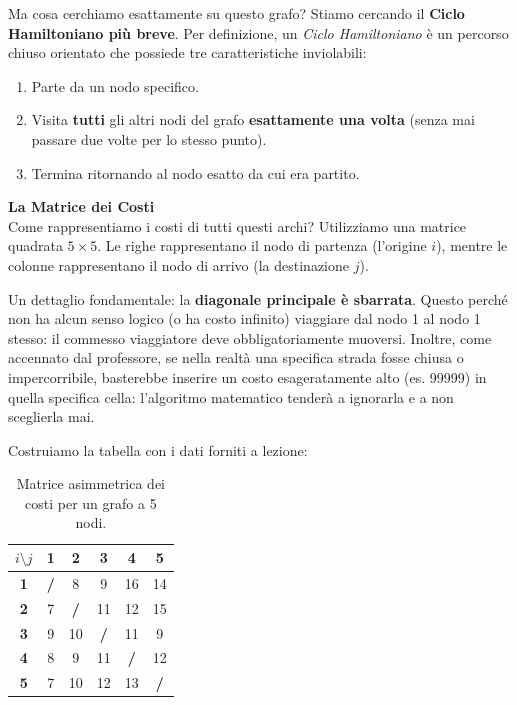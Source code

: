 \documentclass[12pt, a4paper]{article}
\renewcommand{\arraystretch}{1.25}
\begin{document}
	Ma cosa cerchiamo esattamente su questo grafo? Stiamo cercando il \textbf{Ciclo Hamiltoniano più breve}. 
	Per definizione, un \textit{Ciclo Hamiltoniano} è un percorso chiuso orientato che possiede tre caratteristiche inviolabili:
	\begin{enumerate}
		\item Parte da un nodo specifico.
		\item Visita \textbf{tutti} gli altri nodi del grafo \textbf{esattamente una volta} (senza mai passare due volte per lo stesso punto).
		\item Termina ritornando al nodo esatto da cui era partito.
	\end{enumerate}
	
	\vspace{0.4cm}
	\textbf{La Matrice dei Costi}\\
	Come rappresentiamo i costi di tutti questi archi? Utilizziamo una matrice quadrata $5 \times 5$. 
	Le righe rappresentano il nodo di partenza (l'origine $i$), mentre le colonne rappresentano il nodo di arrivo (la destinazione $j$).
	
	Un dettaglio fondamentale: la \textbf{diagonale principale è sbarrata}. Questo perché non ha alcun senso logico (o ha costo infinito) viaggiare dal nodo 1 al nodo 1 stesso: il commesso viaggiatore deve obbligatoriamente muoversi. Inoltre, come accennato dal professore, se nella realtà una specifica strada fosse chiusa o impercorribile, basterebbe inserire un costo esageratamente alto (es. 99999) in quella specifica cella: l'algoritmo matematico tenderà a ignorarla e a non sceglierla mai.
	
	Costruiamo la tabella con i dati forniti a lezione:
	
	\begin{table}[H]
		\centering
		\renewcommand{\arraystretch}{1.5}
		\begin{tabular}{|c|c|c|c|c|c|}
			\hline
			\textbf{$i \setminus j$} & \textbf{1} & \textbf{2} & \textbf{3} & \textbf{4} & \textbf{5} \\ \hline
			\textbf{1} & \textbf{/} & 8 & 9 & 16 & 14 \\ \hline
			\textbf{2} & 7 & \textbf{/} & 11 & 12 & 15 \\ \hline
			\textbf{3} & 9 & 10 & \textbf{/} & 11 & 9 \\ \hline
			\textbf{4} & 8 & 9 & 11 & \textbf{/} & 12 \\ \hline
			\textbf{5} & 7 & 10 & 12 & 13 & \textbf{/} \\ \hline
		\end{tabular}
		\caption{Matrice asimmetrica dei costi per un grafo a 5 nodi.}
	\end{table}
	
\end{document}
